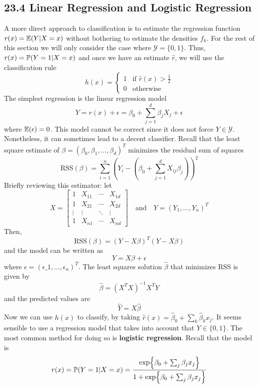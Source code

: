 \subsection*{23.4 Linear Regression and Logistic Regression}\label{linear-regression-and-logistic-regression}
A more direct approach to classification is to estimate the regression
function \(r(x) = \operatorname{\mathbb{E}}(Y | X = x)\) without bothering to estimate
the densities \(f_{k}\). For the rest of this section we will only
consider the case where \(\mathcal{Y} = \{ 0, 1 \}\). Thus,
\(r(x) = \operatorname{\mathbb{P}}(Y = 1 | X = x)\) and once we have an estimate
\(\hat{r}\), we will use the classification rule
\[
h(x) = \begin{cases}
1 &\text{if } \hat{r}(x) > \frac{1}{2} \\
0 &\text{otherwise}
\end{cases} 
\]
The simplest regression is the linear regression model
\[
Y = r(x) + \epsilon = \beta_{0} + \sum_{j=1}^{d} \beta_{j} X_{j} + \epsilon
\]
where \(\operatorname{\mathbb{E}}(\epsilon) = 0\). This model cannot be correct since it
does not force \(Y \in \mathcal{Y}\). Nonetheless, it can sometimes lead
to a decent classifier.
Recall that the least square estimate of
\(\beta = (\beta_{0}, \beta_{1}, \dots, \beta_d)^T\) minimizes the residual
sum of squares
\[
\text{RSS}(\beta) = \sum_{i=1}^{n} \left( Y_{i} - \left( \beta_{0}  + \sum_{j=1}^{d} X_{ij} \beta_{j} \right) \right)^{2}
\]
Briefly reviewing this estimator: let
\[
X = \begin{bmatrix}
1 & X_{11} & \cdots & X_{1d} \\
1 & X_{21} & \cdots & X_{2d} \\
\vdots & \vdots & \ddots & \vdots \\
1 & X_{n1} & \cdots & X_{nd}
\end{bmatrix}
\quad \text{and} \quad
Y = (Y_{1}, \dots, Y_{n})^T
\]
Then,
\[
\text{RSS}(\beta) = (Y - X \beta)^T (Y - X \beta)
\]
and the model can be written as
\[
Y = X \beta + \epsilon
\]
where $ \epsilon = (\epsilon\_{1}, \dots, \epsilon_{n})^{T}$. The least
squares solution \(\hat{\beta}\) that minimizes RSS is given by
\[
\hat{\beta} = (X^T X)^{-1} X^T Y
\]
and the predicted values are
\[
\hat{Y} = X \hat{\beta}
\]
Now we can use \(h(x)\) to classify, by taking
\(\hat{r}(x) = \hat{\beta}_{0} + \sum_{k} \hat{\beta}_{k} x_{j}\).
It seems sensible to use a regression model that takes into account that
\(Y \in \{ 0, 1 \}\). The most common method for doing so is
\textbf{logistic regression}. Recall that the model is
\[
r(x) = \PROB(Y = 1 | X = x) = \frac{\exp \left\{ \beta_{0} + \sum_{j} \beta_{j} x_{j} \right\} }{1 + \exp \left\{ \beta_{0} + \sum_{j} \beta_{j} x_{j} \right\} }
\]
